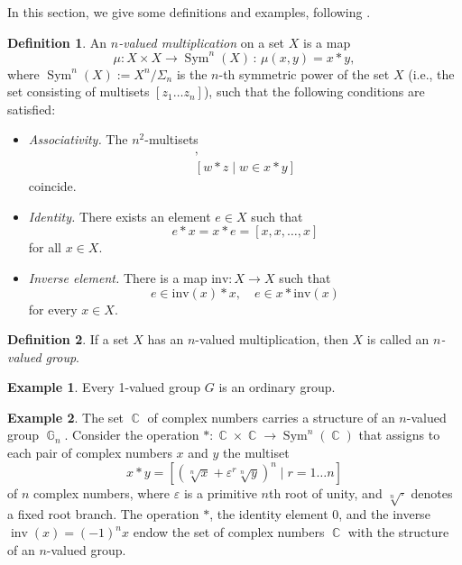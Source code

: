 \documentclass[14pt, dvipsnames]{extarticle}
\theoremstyle{definition}
\theoremstyle{definition}
\newtheorem{defi}{Definition}
\newtheorem{example}{\bf Example}
\theoremstyle{remark}
\DeclareMathOperator{\G}{\mathbb{G}}
\DeclareMathOperator{\Sym}{\mathrm{Sym}}
\DeclareMathOperator{\inv}{\mathrm{inv}}
\DeclareMathOperator{\Cc}{\mathbb{C}}
\renewcommand{\epsilon}{\varepsilon}
\begin{document}
In this section, we give some definitions and examples, following \cite{Buchstaber}.

\begin{defi}\label{nval_group_def}
An {\it $n$-valued multiplication} on a set $X$ is a map
$$\mu: X\times X \to \Sym^n(X)\,:\,\mu(x,y)=x*y,$$
where $\Sym^n(X):=X^n/\Sigma_n$ is the $n$-th symmetric power of the set $X$ (i.e., the set consisting of multisets $[z_1\dots z_n]$), such that the following conditions are satisfied:

\begin{itemize}

\item {\it Associativity.} The $n^2$-multisets
\begin{gather*}
[x\ast w\mid w\in y \ast z],\\
[w\ast z\mid w\in x\ast y]
\end{gather*}
coincide.

\item {\it Identity.} There exists an element $e\in X$ such that $$e\ast x = x\ast e = [x, x, \dots, x]$$ for all $x\in X$.

\item {\it Inverse element.} There is a map $\mathrm{inv}\colon X\to X$ such that
$$e\in \mathrm{inv}(x)* x,\quad e \in x*\mathrm{inv}(x)$$
for every $x\in X$.

\end{itemize}
\end{defi}

\begin{defi}
If a set $X$ has an $n$-valued multiplication, then $X$ is called an {\it $n$-valued group}.
\end{defi}

\begin{example}
Every 1-valued group $G$ is an ordinary group.
\end{example}

\begin{example}\label{G_n_defi}
The set $\Cc$ of complex numbers carries a structure of an $n$-valued group $\G_n$. Consider the operation $\ast: \Cc\times\Cc\to \Sym^n(\Cc)$ that assigns to each pair of complex numbers $x$ and $y$ the multiset
\begin{equation}\label{operation2}
x\ast y = [(\sqrt[n]{x} + \epsilon^r\sqrt[n]{y})^n\mid r = 1\dots n]
\end{equation}
of $n$ complex numbers, where $\epsilon$ is a primitive $n$th root of unity, and $\sqrt[n]{\cdot}$ denotes a fixed root branch. The operation $\ast$, the identity element $0$, and the inverse $\inv(x) = (-1)^n x$ endow the set of complex numbers $\Cc$ with the structure of an $n$-valued group.
\end{example}
\end{document}
